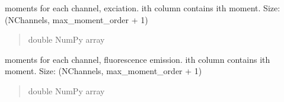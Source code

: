 \documentclass[letterpaper,10pt,english]{sphinxmanual}
\begin{document}
\begin{fulllineitems}
\begin{fulllineitems}
\begin{quote}
\begin{description}
\end{description}\end{quote}

\end{fulllineitems}


\begin{fulllineitems}
\label{\detokenize{_autosummary/nirfasterff.base.data.flTRMomentsdata:nirfasterff.base.data.flTRMomentsdata.momentsx}}
\pysigstartsignatures
\pysigline
{}
\pysigstopsignatures
\sphinxAtStartPar
moments for each channel, exciation. i\sphinxhyphen{}th column contains i\sphinxhyphen{}th moment. Size: (NChannels, max\_moment\_order + 1)
\begin{quote}\begin{description}
\sphinxAtStartPar
double NumPy array

\end{description}\end{quote}

\end{fulllineitems}


\begin{fulllineitems}
\label{\detokenize{_autosummary/nirfasterff.base.data.flTRMomentsdata:nirfasterff.base.data.flTRMomentsdata.momentsfl}}
\pysigstartsignatures
\pysigline
{}
\pysigstopsignatures
\sphinxAtStartPar
moments for each channel, fluorescence emission. i\sphinxhyphen{}th column contains i\sphinxhyphen{}th moment. Size: (NChannels, max\_moment\_order + 1)
\begin{quote}\begin{description}
\sphinxAtStartPar
double NumPy array

\end{description}\end{quote}

\end{fulllineitems}



\end{fulllineitems}
\end{document}
